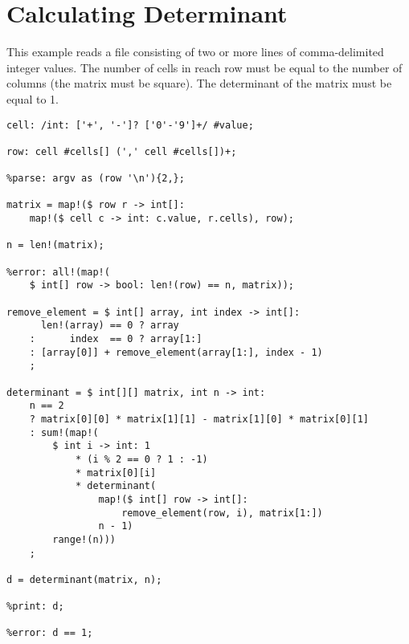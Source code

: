
\section{Calculating Determinant}
{
	This example reads a file consisting of two or more lines of comma-delimited
	integer values. The number of cells in reach row must be equal to the
	number of columns (the matrix must be square).
	The determinant of the matrix must be equal to 1.

\begin{lstlisting}[texcl=true, language=MAIA]
cell: /int: ['+', '-']? ['0'-'9']+/ #value;

row: cell #cells[] (',' cell #cells[])+;

%parse: argv as (row '\n'){2,};

matrix = map!($ row r -> int[]:
	map!($ cell c -> int: c.value, r.cells), row);

n = len!(matrix);

%error: all!(map!(
	$ int[] row -> bool: len!(row) == n, matrix));

remove_element = $ int[] array, int index -> int[]:
	  len!(array) == 0 ? array
	:      index  == 0 ? array[1:]
	: [array[0]] + remove_element(array[1:], index - 1)
	;

determinant = $ int[][] matrix, int n -> int:
	n == 2
	? matrix[0][0] * matrix[1][1] - matrix[1][0] * matrix[0][1]
	: sum!(map!(
		$ int i -> int: 1
			* (i % 2 == 0 ? 1 : -1)
			* matrix[0][i]
			* determinant(
				map!($ int[] row -> int[]: 
					remove_element(row, i), matrix[1:])
				n - 1)
		range!(n)))
	;

d = determinant(matrix, n);

%print: d;

%error: d == 1;
\end{lstlisting}
}














